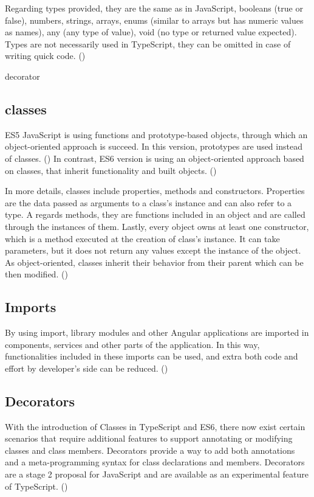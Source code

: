 Regarding types provided, they are the same as in JavaScript, booleans (true or false), numbers, strings, arrays, enums (similar to arrays but has numeric values as names), any (any type of value), void (no type or returned value expected). Types are not necessarily used in TypeScript, they can be omitted in case of writing quick code. (\cite{murray2018ng}) \par
decorator
\subsection{classes} 


ES5 JavaScript is using functions and prototype-based objects, through which an object-oriented approach is succeed. In this version, prototypes are used instead of classes. (\cite{murray2018ng}) In contrast, ES6 version is using an object-oriented approach based on classes, that inherit functionality and built objects. (\cite{Typescript}) \par

In more details, classes include properties, methods and constructors. Properties are the data passed as arguments to a class's instance and can also refer to a type. A regards methods, they are functions included in an object and are called through the instances of them. Lastly, every object owns at least one constructor, which is a method executed at the creation of class's instance. It can take parameters, but it does not return any values except the instance of the object. As object-oriented, classes inherit their behavior from their parent which can be then modified. (\cite{murray2018ng}) \par

\subsection{Imports}

By using import, library modules and other Angular applications are imported in components, services and other parts of the application. In this way, functionalities included in these imports can be used, and extra both code and effort by developer's side can be reduced. (\cite{angularUpandRunning})

\subsection{Decorators}

With the introduction of Classes in TypeScript and ES6, there now exist certain scenarios that require additional features to support annotating or modifying classes and class members. Decorators provide a way to add both annotations and a meta-programming syntax for class declarations and members. Decorators are a stage 2 proposal for JavaScript and are available as an experimental feature of TypeScript. (\cite{Typescript})

